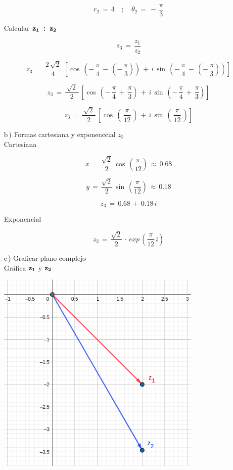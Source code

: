 \documentclass[a4paper,11pt,openany]{book}
\begin{document}
$$\boxed{r_{2}\,=\,4 \quad;\quad \theta_{2}\,=\,-\,\dfrac{\pi}{3}}$$

\textcolor{ao(english)}{} Calcular $\bf{z_{1}\,\div\,z_{2}}$

$$z_{3}\,=\,\dfrac{z_{1}}{z_{2}}$$

$$z_{3}\,=\,\dfrac{\,2\,\sqrt{2}\,}{4}\,\left[\cos\,\left(-\,\dfrac{\pi}{4}\,-\,\left(-\,\dfrac{\pi}{3}\right)\right)\,+\,i\,\sin\,\left(-\,\dfrac{\pi}{4}\,-\,\left(-\,\dfrac{\pi}{3}\right)\right)\right]$$

$$z_{3}\,=\,\dfrac{\,\sqrt{2}\,}{2}\,\left[\cos\,\left(-\,\dfrac{\pi}{4}\,+\,\dfrac{\pi}{3}\right)\,+\,i\,\sin\,\left(-\,\dfrac{\pi}{4}\,+\,\dfrac{\pi}{3}\right)\right]$$

$$z_{3}\,=\,\dfrac{\,\sqrt{2}\,}{2}\,\left[\cos\,\left(\,\dfrac{\pi}{12}\,\right)\,+\,i\,\sin\,\left(\,\dfrac{\pi}{12}\,\right)\right]$$

\textcolor{ao(english)}{b\,)} Formas cartesiana y exponenccial $z_{3}$\\

\textcolor{ao(english)}{} Cartesiana

$$x\,=\,\dfrac{\sqrt{2}}{2}\,\cos\,\left(\dfrac{\pi}{12}\right)\,\approx\,0.68$$

$$y\,=\,\dfrac{\sqrt{2}}{2}\,\sin\,\left(\dfrac{\pi}{12}\right)\,\approx\,0.18$$

$$z_{3}\,=\,0.68\,+\,0.18\,i$$

\newpage

\textcolor{ao(english)}{} Exponencial

$$z_{3}\,=\,\dfrac{\sqrt{2}}{2}\,\cdot\,exp\,\left(\dfrac{\pi}{12}\,i\right)$$

\textcolor{ao(english)}{c\,)} Graficar plano complejo\\

\textcolor{ao(english)}{} Gráfica $\bf{z_{1}}$ y $\bf{z_{2}}$

\begin{center}
    \includegraphics[width=10cm]{Gra-Ej-6-1.png}
\end{center}
\end{document}
